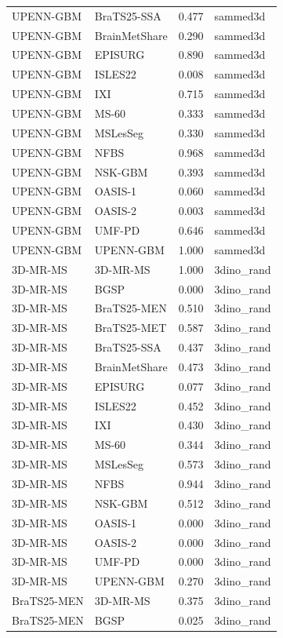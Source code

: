 \begin{tabular}{llrl}
UPENN-GBM & BraTS25-SSA & 0.477 & sammed3d \\
UPENN-GBM & BrainMetShare & 0.290 & sammed3d \\
UPENN-GBM & EPISURG & 0.890 & sammed3d \\
UPENN-GBM & ISLES22 & 0.008 & sammed3d \\
UPENN-GBM & IXI & 0.715 & sammed3d \\
UPENN-GBM & MS-60 & 0.333 & sammed3d \\
UPENN-GBM & MSLesSeg & 0.330 & sammed3d \\
UPENN-GBM & NFBS & 0.968 & sammed3d \\
UPENN-GBM & NSK-GBM & 0.393 & sammed3d \\
UPENN-GBM & OASIS-1 & 0.060 & sammed3d \\
UPENN-GBM & OASIS-2 & 0.003 & sammed3d \\
UPENN-GBM & UMF-PD & 0.646 & sammed3d \\
UPENN-GBM & UPENN-GBM & 1.000 & sammed3d \\
3D-MR-MS & 3D-MR-MS & 1.000 & 3dino\_rand \\
3D-MR-MS & BGSP & 0.000 & 3dino\_rand \\
3D-MR-MS & BraTS25-MEN & 0.510 & 3dino\_rand \\
3D-MR-MS & BraTS25-MET & 0.587 & 3dino\_rand \\
3D-MR-MS & BraTS25-SSA & 0.437 & 3dino\_rand \\
3D-MR-MS & BrainMetShare & 0.473 & 3dino\_rand \\
3D-MR-MS & EPISURG & 0.077 & 3dino\_rand \\
3D-MR-MS & ISLES22 & 0.452 & 3dino\_rand \\
3D-MR-MS & IXI & 0.430 & 3dino\_rand \\
3D-MR-MS & MS-60 & 0.344 & 3dino\_rand \\
3D-MR-MS & MSLesSeg & 0.573 & 3dino\_rand \\
3D-MR-MS & NFBS & 0.944 & 3dino\_rand \\
3D-MR-MS & NSK-GBM & 0.512 & 3dino\_rand \\
3D-MR-MS & OASIS-1 & 0.000 & 3dino\_rand \\
3D-MR-MS & OASIS-2 & 0.000 & 3dino\_rand \\
3D-MR-MS & UMF-PD & 0.000 & 3dino\_rand \\
3D-MR-MS & UPENN-GBM & 0.270 & 3dino\_rand \\
BraTS25-MEN & 3D-MR-MS & 0.375 & 3dino\_rand \\
BraTS25-MEN & BGSP & 0.025 & 3dino\_rand \\

\end{tabular}
